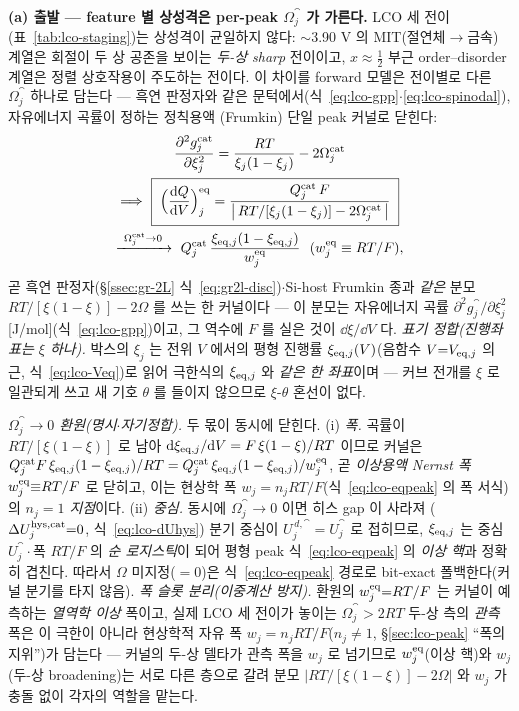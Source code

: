 \textbf{(a) 출발 --- feature 별 상성격은 per-peak $\Omega_j^\cat$ 가 가른다.} LCO 세 전이(표~\ref{tab:lco-staging})는
상성격이 균일하지 않다: $\sim$3.90 V 의 MIT(절연체$\to$금속) 계열은 회절이 두 상 공존을 보이는 \emph{두-상 sharp}
전이이고\cite{reimers1992,menetrier1999}, $x\approx\tfrac12$ 부근 order--disorder 계열은 정렬 상호작용이 주도하는
전이다\cite{vanderven1998}. 이 차이를 forward 모델은 전이별로 다른 $\Omega_j^\cat$ 하나로 담는다 --- 흑연
판정자와 같은 문턱에서(식~\eqref{eq:lco-gpp}$\cdot$\eqref{eq:lco-spinodal}), 자유에너지 곡률이 정하는 정칙용액
(Frumkin) 단일 peak 커널로 닫힌다:
\begin{multline}
\frac{\partial^2 g_j^\cat}{\partial\xi_j^2}=\frac{RT}{\xi_j(1-\xi_j)}-2\Omega_j^\cat \\
\Longrightarrow\
\boxed{\;\Big(\frac{\dd Q}{\dd V}\Big)^\eq_j=\frac{Q_j^\cat\,F}{\big|\,RT/[\xi_j(1-\xi_j)]-2\Omega_j^\cat\,\big|}\;} \\
\xrightarrow[\ ]{\ \Omega_j^\cat\to0\ }\
Q_j^\cat\,\frac{\xi_{\eq,j}(1-\xi_{\eq,j})}{w_j^{\eq}}\ \ (w_j^{\eq}\equiv RT/F),
\label{eq:lcoomega-kernel}
\end{multline}
곧 흑연 판정자(\S\ref{ssec:gr-2L} 식~\eqref{eq:gr2l-disc})$\cdot$Si-host Frumkin 종과 \emph{같은} 분모
$RT/[\xi(1-\xi)]-2\Omega$ 를 쓰는 한 커널이다 --- 이 분모는 자유에너지 곡률 $\partial^2 g_j^\cat/\partial\xi_j^2$
[J/mol](식~\eqref{eq:lco-gpp})이고, 그 역수에 $F$ 를 실은 것이 $\dd\xi/\dd V$ 다. \emph{표기 정합(진행좌표는 $\xi$
하나).} 박스의 $\xi_j$ 는 전위 $V$ 에서의 평형 진행률 $\xi_{\mathrm{eq},j}(V)$(음함수 $V{=}V_{\mathrm{eq},j}$ 의 근,
식~\eqref{eq:lco-Veq})로 읽어 극한식의 $\xi_{\mathrm{eq},j}$ 와 \emph{같은 한 좌표}이며 --- 커브 전개를 $\xi$ 로 일관되게
쓰고 새 기호 $\theta$ 를 들이지 않으므로 $\xi$-$\theta$ 혼선이 없다.

\emph{$\Omega_j^\cat\to0$ 환원(명시$\cdot$자기정합).} 두 몫이 동시에 닫힌다. (i) \emph{폭.} 곡률이
$RT/[\xi(1-\xi)]$ 로 남아 $\mathrm{d}\xi_{\mathrm{eq},j}/\mathrm{d} V=F\,\xi(1-\xi)/RT$ 이므로 커널은
$Q_j^{\mathrm{cat}} F\,\xi_{\mathrm{eq},j}(1-\xi_{\mathrm{eq},j})/RT=Q_j^{\mathrm{cat}}\,\xi_{\mathrm{eq},j}(1-\xi_{\mathrm{eq},j})/w_j^{\mathrm{eq}}$, 곧 \emph{이상용액
Nernst 폭} $w_j^{\mathrm{eq}}{\equiv}RT/F$ 로 닫히고, 이는 현상학 폭 $w_j{=}n_jRT/F$(식~\eqref{eq:lco-eqpeak} 의 폭
서식)의 \emph{$n_j{=}1$ 지점}이다. (ii) \emph{중심.} 동시에 $\Omega_j^\cat\!\to\!0$ 이면 히스 gap 이 사라져
($\Delta U_j^{\mathrm{hys},\mathrm{cat}}{=}0$, 식~\eqref{eq:lco-dUhys}) 분기 중심이 $U_j^{\,d,\cat}{=}U_j^\cat$ 로 접히므로,
$\xi_{\mathrm{eq},j}$ 는 중심 $U_j^\cat\cdot$폭 $RT/F$ 의 \emph{순 로지스틱}이 되어 평형 peak 식~\eqref{eq:lco-eqpeak} 의
\emph{이상 핵}과 정확히 겹친다. 따라서 $\Omega$ 미지정($=0$)은 식~\eqref{eq:lco-eqpeak} 경로로 bit-exact
폴백한다(커널 분기를 타지 않음). \emph{폭 슬롯 분리(이중계산 방지).} 환원의 $w_j^{\mathrm{eq}}{=}RT/F$ 는 커널이
예측하는 \emph{열역학 이상} 폭이고, 실제 LCO 세 전이가 놓이는 $\Omega_j^\cat>2RT$ 두-상 측의 \emph{관측} 폭은
이 극한이 아니라 현상학적 자유 폭 $w_j{=}n_jRT/F$($n_j\neq1$, \S\ref{sec:lco-peak} ``폭의 지위'')가 담는다 ---
커널의 두-상 델타가 관측 폭을 $w_j$ 로 넘기므로 $w_j^{\mathrm{eq}}$(이상 핵)와 $w_j$(두-상 broadening)는 서로 다른
층으로 갈려 분모 $|RT/[\xi(1-\xi)]-2\Omega|$ 와 $w_j$ 가 충돌 없이 각자의 역할을 맡는다.

